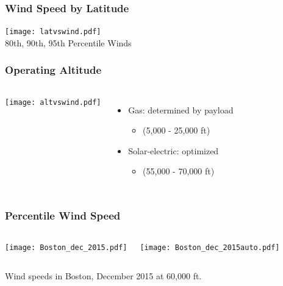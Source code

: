 \documentclass{beamer}
\begin{document}
\begin{frame}
    \frametitle{Wind Speed by Latitude}

    \begin{center}
    \texttt{[image: latvswind.pdf]} \\
    \scriptsize
    80th, 90th, 95th Percentile Winds
    \end{center}

\end{frame}

\begin{frame}
    \frametitle{Operating Altitude}
    
    \begin{columns}
        \texttt{[image: altvswind.pdf]}

        \pause
        
        \begin{itemize}
            \item Gas: determined by payload
                \begin{itemize}
                    \item (5,000 - 25,000 ft)
                    \end{itemize}
                    \pause
            \item Solar-electric: optimized 
                \begin{itemize}
                    \item (55,000 - 70,000 ft)
                    \end{itemize}
                \end{itemize}
        
    \end{columns}

\end{frame}

\begin{frame}
    \frametitle{Percentile Wind Speed}
    
    \begin{columns}
        \texttt{[image: Boston\_dec\_2015.pdf]}
        
        \texttt{[image: Boston\_dec\_2015auto.pdf]}
    \end{columns}

    \begin{center}
    Wind speeds in Boston, December 2015 at 60,000 ft. 
    \end{center}
    
\end{frame}
\end{document}
